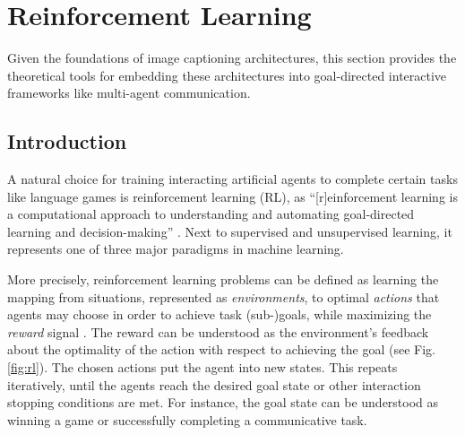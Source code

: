 \section{Reinforcement Learning}
\label{rl}

Given the foundations of image captioning architectures, this section provides the theoretical tools for embedding these architectures into goal-directed interactive frameworks like multi-agent communication.

\subsection{Introduction}
A natural choice for training interacting artificial agents to complete certain tasks like language games is reinforcement learning (RL), as ``[r]einforcement learning is a computational approach to understanding and automating goal-directed learning and decision-making'' \parencite[][p.~15]{sutton2018reinforcement}. Next to supervised and unsupervised learning, it represents one of three major paradigms in machine learning. 

More precisely, reinforcement learning problems can be defined as learning the mapping from situations, represented as \textit{environments}, to optimal \textit{actions} that agents may choose in order to achieve task (sub-)goals, while maximizing the \textit{reward} signal \parencite{sutton2018reinforcement}. The reward can be understood as the environment's feedback about the optimality of the action with respect to achieving the goal (see Fig. \ref{fig:rl}). The chosen actions put the agent into new states. This repeats iteratively, until the agents reach the desired goal state or other interaction stopping conditions are met. For instance, the goal state can be understood as winning a game or successfully completing a communicative task. 

